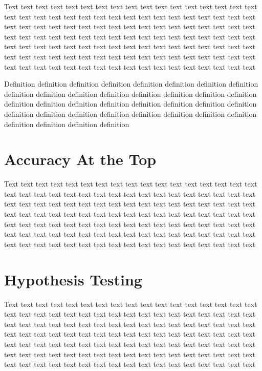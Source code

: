 \documentclass{Thesis}
\begin{document}
\cite{adam2019machine,agarwal2011infinite}

Text text text text text text text text text text text text text text text text text text text text text text text text text text text text text text text text text text text text text text text text text text text text text text text text text text text text text text text text text text text text text text text text text text text text text text text text text text text text text text text text text text text text text text text text text text text text text text text text text text text text text text text text text text text text text text text text text text text text text text text

\begin{definition}
  Definition definition definition definition definition definition definition definition definition definition definition definition definition definition definition definition definition definition definition definition definition definition definition definition definition definition definition definition definition definition definition definition definition definition definition definition
\end{definition}

\section{Accuracy At the Top}

Text text text text text text text text text text text text text text text text text text text text text text text text text text text text text text text text text text text text text text text text text text text text text text text text text text text text text text text text text text text text text text text text text text text text text text text text text text text text text text text text text text text text text text text text text text text text text text text text text text text text text text text text text text text text text text text text text text text text text text text

\section{Hypothesis Testing}

Text text text text text text text text text text text text text text text text text text text text text text text text text text text text text text text text text text text text text text text text text text text text text text text text text text text text text text text text text text text text text text text text text text text text text text text text text text text text text text text text text text text text text text text text text text text text text text text text text text text text text text text text text text text text text text text text text text text text text text text
\end{document}
